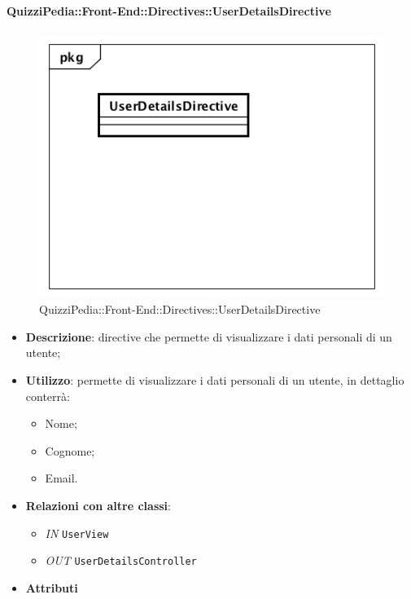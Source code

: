 \paragraph{QuizziPedia::Front-End::Directives::UserDetailsDirective}

\label{QuizziPedia::Front-End::Directives::UserDetailsDirective}

\begin{figure}[h]
	\centering
	\includegraphics[scale=0.5,keepaspectratio]{UML/Classi/Front-End/QuizziPedia_Front-end_Directives_UserDetailsDirective.png}
	\caption{QuizziPedia::Front-End::Directives::UserDetailsDirective}
\end{figure}

\begin{itemize}
	\item \textbf{Descrizione}: directive che permette di visualizzare i dati personali di un utente;
	\item \textbf{Utilizzo}: permette di visualizzare i dati personali di un utente, in dettaglio conterrà:
	\begin{itemize}
		\item Nome;
		\item Cognome;
		\item Email.
	\end{itemize}
	\item \textbf{Relazioni con altre classi}:
	\begin{itemize}
		\item \textit{IN} \texttt{UserView} 
		\item \textit{OUT} \texttt{UserDetailsController} 
	\end{itemize}
	\item \textbf{Attributi}
\end{itemize}

